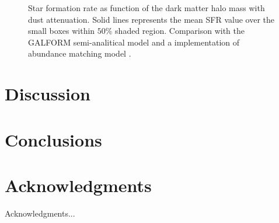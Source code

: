 \documentclass{emulateapj}
\begin{document}
\begin{figure}
\caption{Star formation rate as function of the dark matter halo mass with dust attenuation. 
Solid lines represents the mean SFR value over the small boxes within $50\%$  shaded region.
Comparison with the GALFORM semi-analitical model \citep{gonzalez14} and a implementation
of abundance matching model \citep{Behroozi13}. }
\label{graph_SFR_DMHM_w}
\end{figure}



\section{Discussion}
\label{sec:discussion}


\section{Conclusions}
\label{sec:conclusions}


\section*{Acknowledgments}
Acknowledgments...\\



\end{document}
